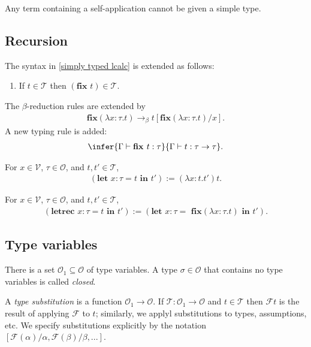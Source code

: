 \documentclass{article}
\begin{document}
\begin{proposition*}[III.15]
	Any term containing a self-application cannot be given a simple type.
\end{proposition*}

\subsection{Recursion}

\begin{definition*}
	The syntax in \ref{simply typed lcalc} is extended as follows:
	\begin{enumerate}[label=L4.]
		\item If $t\in\mathcal{T}$ then $(\textbf{fix }t)\in\mathcal{T}$.
	\end{enumerate}	
	The $\beta$-reduction rules are extended by \begin{align*}
		\textbf{fix}(\lambda x:\tau.t)\to_\beta t[\textbf{fix}(\lambda x:\tau.t)/x].
	\end{align*}
	A new typing rule is added: \begin{align*}
		\infer{\Gamma \vdash \textbf{fix }t:\tau}{\Gamma \vdash t:\tau\to\tau}.
	\end{align*}
\end{definition*}

\begin{definition*}[let]
	For $x\in\mathcal{V}$, $\tau\in\mathcal{O}$, and $t,t'\in\mathcal{T}$,
	\begin{align*}
		(\textbf{let $x:\tau = t$ in $t'$}) := (\lambda x:t.t')t.	
	\end{align*}
\end{definition*}

\begin{definition*}[letrec]
	For $x\in\mathcal{V}$, $\tau\in\mathcal{O}$, and $t,t'\in\mathcal{T}$,
	\begin{align*}
		(\textbf{letrec $x:\tau=t$ in $t'$}) := (\textbf{let $x:\tau=$ fix$(\lambda x:\tau.t)$ in $t'$}).	
	\end{align*}
\end{definition*}

\subsection{Type variables}

\begin{definition*}
	There is a set $\mathcal{O}_1\subseteq\mathcal{O}$ of type variables. A type $\sigma\in\mathcal{O}$
	that contains no type variables is called \emph{closed}.

	A \emph{type substitution} is a function $\mathcal{O}_1\to\mathcal{O}$. If
	$\mathcal{T}:\mathcal{O}_1\to\mathcal{O}$ and $t\in\mathcal{T}$ then $\mathcal{F} t$ is the result 
	of applying $\mathcal{F}$ to $t$; similarly, we applyl substitutions to types, assumptions, etc.
	We specify substitutions explicitly by the notation $[\mathcal{F}(\alpha)/\alpha, 
	\mathcal{F}(\beta)/\beta,...]$.
\end{definition*}
\end{document}

